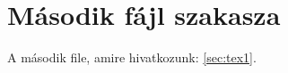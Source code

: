 \section{Második fájl szakasza}
\label{sec:file2}
A második file, amire hivatkozunk: \ref{sec:tex1}.